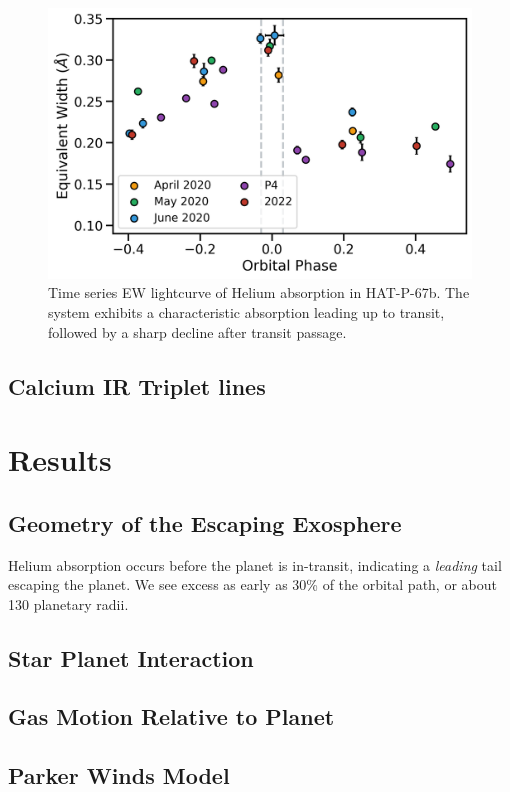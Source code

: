\documentclass[twocolumn]{aastex631}
\begin{document}
\begin{figure}
    \includegraphics[width=\linewidth]{figures/HAT_P_67b_Helium10830EW_byCampaign.png}
    \caption{Time series EW lightcurve of Helium absorption in HAT-P-67b.  The system exhibits a characteristic absorption leading up to transit, followed by a sharp decline after transit passage.  }
    \label{fig:HPFtimeseries}
\end{figure}

\subsection{Calcium IR Triplet lines}

\section{Results}

\subsection{Geometry of the Escaping Exosphere}
Helium absorption occurs before the planet is in-transit, indicating a \emph{leading} tail escaping the planet. We see excess as early as 30\% of the orbital path, or about 130 planetary radii.

\subsection{Star Planet Interaction}
\subsection{Gas Motion Relative to Planet}
\subsection{Parker Winds Model}
\end{document}
